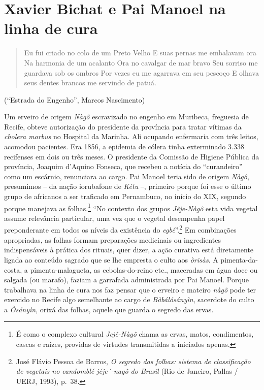 \chapter{Xavier Bichat e Pai Manoel na linha de cura}

\begin{quote}
Eu fui criado no colo de um Preto Velho E suas pernas me embalavam ora
Na harmonia de um acalanto Ora no cavalgar de mar bravo Seu sorriso me
guardava sob os ombros Por vezes eu me agarrava em seu pescoço E olhava
seus dentes brancos me servindo de patuá.
\end{quote}

(``Estrada do Engenho'', Marcos Nascimento)

Um erveiro de origem \emph{Nàgô} escravizado no engenho em Muribeca,
freguesia de Recife, obteve autorização do presidente da província para
tratar vítimas da \emph{cholera morbus} no Hospital da Marinha. Ali
ocupando enfermaria com três leitos, acomodou pacientes. Era 1856, a
epidemia de cólera tinha exterminado 3.338 recifenses em dois ou três
meses. O presidente da Comissão de Higiene Pública da província, Joaquim
d'Aquino Fonseca, que recebeu a notícia do ``curandeiro'' como um
escárnio, renunciara ao cargo. Pai Manoel teria sido de origem
\emph{Nàgô}, presumimos -- da nação iorubafone de \emph{Kétu­} --,
primeiro porque foi esse o último grupo de africanos a ser traficado em
Pernambuco, no início do XIX, segundo porque manejava as
folhas.\footnote{É como o complexo cultural \emph{Jejê-Nàgô} chama as
  ervas, matos, condimentos, cascas e raízes, providas de virtudes
  transmitidas a iniciados apenas.} ``No contexto dos grupos
\emph{Jêje-Nàgô} esta vida vegetal assume relevância particular, uma vez
que o vegetal desempenha papel preponderante em todos os níveis da
existência do \emph{egbé}''.\footnote{José Flávio Pessoa de Barros,
  \emph{O segredo das folhas: sistema de classificação de vegetais no
  candomblé jéje´-nagô do Brasil} (Rio de Janeiro, Pallas / UERJ, 1993),
  p.~38.} Em combinações apropriadas, as folhas formam preparações
medicinais ou ingredientes indispensáveis à prática dos rituais, quer
dizer, a ação curativa está diretamente ligada ao conteúdo sagrado que
se lhe empresta o culto aos \emph{òrisàs}. A pimenta-da-costa, a
pimenta-malagueta, as cebolas-do-reino etc., maceradas em água doce ou
salgada (ou marafo), faziam a garrafada administrada por Pai Manoel.
Porque trabalhava na linha de cura nos faz pensar que o erveiro e
mateiro \emph{nàgô} pode ter exercido no Recife algo semelhante ao cargo
de \emph{Bàbálósányìn}, sacerdote do culto a \emph{Òsányìn}, orixá das
folhas, aquele que guarda o segredo das ervas.

